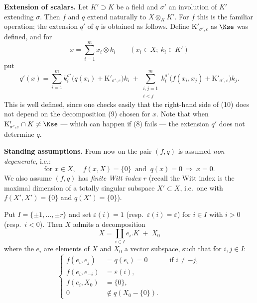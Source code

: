 \documentclass[12pt,a4paper,oneside,english]{smfart}
\theoremstyle{definition}
\theoremstyle{bt}
\begin{document}
\smallskip
\textbf{Extension of scalars.} Let $K'\supset K$ be a field and $\sigma'$ an
involution of $K'$ extending $\sigma$. Then $f$ and $q$ extend naturally to
$X\otimes_K K'$. For $f$ this is the familiar operation; the extension $q'$ of
$q$ is obtained as follows. Define $\mathrm{K}'_{\sigma',\varepsilon}$ as $\Kse$
was defined, and for
\begin{equation}
x=\sum_{i=1}^{m}x_i\otimes k_i \qquad (x_i\in X;\ k_i\in K') \tag{9}
\end{equation}
put
\begin{equation}
q'(x)=\sum_{i=1}^{m}k_i^{\sigma'}\bigl(q(x_i)+\mathrm{K}'_{\sigma',\varepsilon}\bigr)k_i
 \;+\!\!\sum_{\substack{i,j=1\\ i<j}}^{m}\!\!
   k_i^{\sigma'}\bigl(f(x_i,x_j)+\mathrm{K}'_{\sigma',\varepsilon}\bigr)k_j . \tag{10}
\end{equation}
This is well defined, since one checks easily that the right-hand side of (10)
does not depend on the decomposition (9) chosen for $x$. Note that when
$\mathrm{K}'_{\sigma',\varepsilon}\cap K\neq\Kse$ --- which can happen if (8)
fails --- the extension $q'$ does not determine $q$.

\smallskip
\textbf{Standing assumptions.} From now on the pair $(f,q)$ is assumed
\emph{non-degenerate}, i.e.:
\begin{equation}
\text{for }x\in X,\quad f(x,X)=\{0\}\ \text{ and }\ q(x)=0
\ \Longrightarrow\ x=0. \tag{11}
\end{equation}
We also assume $(f,q)$ has \emph{finite Witt index} $r$ (recall the Witt index
is the maximal dimension of a totally singular subspace $X'\subset X$, i.e.\ one
with $f(X',X')=\{0\}$ and $q(X')=\{0\}$).

Put $I=\{\pm1,\dots,\pm r\}$ and set $\varepsilon(i)=1$ (resp.\
$\varepsilon(i)=\varepsilon$) for $i\in I$ with $i>0$ (resp.\ $i<0$). Then $X$
admits a decomposition
\[
X=\coprod_{i\in I}e_i.K\;+\;X_0
\]
where the $e_i$ are elements of $X$ and $X_0$ a vector subspace, such that for
$i,j\in I$:
\begin{equation}
\left\{
\begin{aligned}
f(e_i,e_j)&=q(e_i)=0 &&\text{if } i\neq -j,\\
f(e_i,e_{-i})&=\varepsilon(i),\\
f(e_i,X_0)&=\{0\},\\
0&\notin q(X_0-\{0\}).
\end{aligned}\right. \tag{12}
\end{equation}
\end{document}
